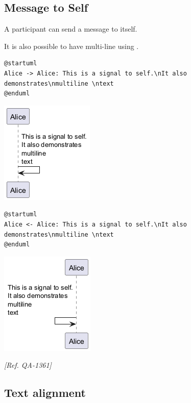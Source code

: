 %
%
\subsection{Message to Self}


A participant can send a message to itself.


It is also possible to have multi-line using \texttt{\textbackslashn}.


\begin{verbatim}
@startuml
Alice -> Alice: This is a signal to self.\nIt also demonstrates\nmultiline \ntext
@enduml
\end{verbatim}
\begin{center}
\includegraphics[scale=0.60]{imgw/img-83e0a2ff75504a63c1db6b286565bf38.png}
\end{center}


\begin{verbatim}
@startuml
Alice <- Alice: This is a signal to self.\nIt also demonstrates\nmultiline \ntext
@enduml
\end{verbatim}
\begin{center}
\includegraphics[scale=0.60]{imgw/img-395f23eec190f589f05ca92c5ba19f8d.png}
\end{center}
\textit{[Ref. QA-1361]}
%
%
\subsection{Text alignment}


